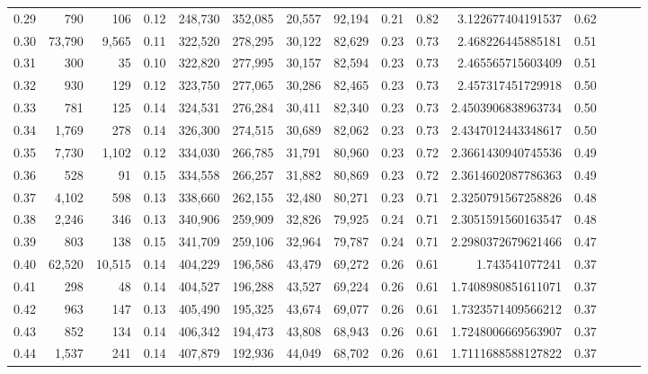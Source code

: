 \begin{tabular}{rrrrrrrrrrrrrrr}
0.29 &     790 &     106 &  0.12 &  248,730 &  352,085 &   20,557 &   92,194 &  0.21 &  0.82 &     3.122677404191537 &      0.62 \\
0.30 &  73,790 &   9,565 &  0.11 &  322,520 &  278,295 &   30,122 &   82,629 &  0.23 &  0.73 &     2.468226445885181 &      0.51 \\
0.31 &     300 &      35 &  0.10 &  322,820 &  277,995 &   30,157 &   82,594 &  0.23 &  0.73 &     2.465565715603409 &      0.51 \\
0.32 &     930 &     129 &  0.12 &  323,750 &  277,065 &   30,286 &   82,465 &  0.23 &  0.73 &     2.457317451729918 &      0.50 \\
0.33 &     781 &     125 &  0.14 &  324,531 &  276,284 &   30,411 &   82,340 &  0.23 &  0.73 &    2.4503906838963734 &      0.50 \\
0.34 &   1,769 &     278 &  0.14 &  326,300 &  274,515 &   30,689 &   82,062 &  0.23 &  0.73 &    2.4347012443348617 &      0.50 \\
0.35 &   7,730 &   1,102 &  0.12 &  334,030 &  266,785 &   31,791 &   80,960 &  0.23 &  0.72 &    2.3661430940745536 &      0.49 \\
0.36 &     528 &      91 &  0.15 &  334,558 &  266,257 &   31,882 &   80,869 &  0.23 &  0.72 &    2.3614602087786363 &      0.49 \\
0.37 &   4,102 &     598 &  0.13 &  338,660 &  262,155 &   32,480 &   80,271 &  0.23 &  0.71 &    2.3250791567258826 &      0.48 \\
0.38 &   2,246 &     346 &  0.13 &  340,906 &  259,909 &   32,826 &   79,925 &  0.24 &  0.71 &    2.3051591560163547 &      0.48 \\
0.39 &     803 &     138 &  0.15 &  341,709 &  259,106 &   32,964 &   79,787 &  0.24 &  0.71 &    2.2980372679621466 &      0.47 \\
0.40 &  62,520 &  10,515 &  0.14 &  404,229 &  196,586 &   43,479 &   69,272 &  0.26 &  0.61 &        1.743541077241 &      0.37 \\
0.41 &     298 &      48 &  0.14 &  404,527 &  196,288 &   43,527 &   69,224 &  0.26 &  0.61 &    1.7408980851611071 &      0.37 \\
0.42 &     963 &     147 &  0.13 &  405,490 &  195,325 &   43,674 &   69,077 &  0.26 &  0.61 &    1.7323571409566212 &      0.37 \\
0.43 &     852 &     134 &  0.14 &  406,342 &  194,473 &   43,808 &   68,943 &  0.26 &  0.61 &    1.7248006669563907 &      0.37 \\
0.44 &   1,537 &     241 &  0.14 &  407,879 &  192,936 &   44,049 &   68,702 &  0.26 &  0.61 &    1.7111688588127822 &      0.37 \\

\end{tabular}
